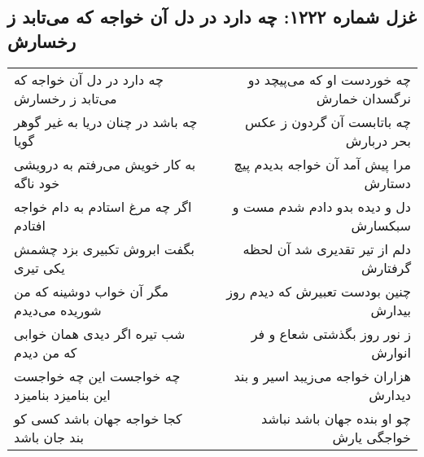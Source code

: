 \begin{center}
\section*{غزل شماره ۱۲۲۲: چه دارد در دل آن خواجه که می‌تابد ز رخسارش}
\label{sec:1222}
\begin{longtable}{l p{0.5cm} r}
چه دارد در دل آن خواجه که می‌تابد ز رخسارش
&&
چه خوردست او که می‌پیچد دو نرگسدان خمارش
\\
چه باشد در چنان دریا به غیر گوهر گویا
&&
چه باتابست آن گردون ز عکس بحر دربارش
\\
به کار خویش می‌رفتم به درویشی خود ناگه
&&
مرا پیش آمد آن خواجه بدیدم پیچ دستارش
\\
اگر چه مرغ استادم به دام خواجه افتادم
&&
دل و دیده بدو دادم شدم مست و سبکسارش
\\
بگفت ابروش تکبیری بزد چشمش یکی تیری
&&
دلم از تیر تقدیری شد آن لحظه گرفتارش
\\
مگر آن خواب دوشینه که من شوریده می‌دیدم
&&
چنین بودست تعبیرش که دیدم روز بیدارش
\\
شب تیره اگر دیدی همان خوابی که من دیدم
&&
ز نور روز بگذشتی شعاع و فر انوارش
\\
چه خواجست این چه خواجست این بنامیزد بنامیزد
&&
هزاران خواجه می‌زیبد اسیر و بند دیدارش
\\
کجا خواجه جهان باشد کسی کو بند جان باشد
&&
چو او بنده جهان باشد نباشد خواجگی یارش
\\
\end{longtable}
\end{center}
